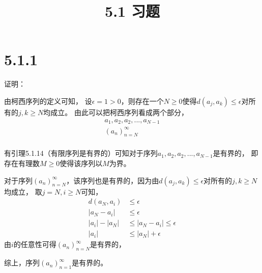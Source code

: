 \documentclass{article}
\theoremstyle{mystyle}
\begin{document}
\title{5.1 习题}
\maketitle

\section*{5.1.1}

证明：

由柯西序列的定义可知，
设$\epsilon = 1 > 0$，则存在一个$N \geq 0$使得$d(a_j,a_k) \leq \epsilon$对所有的$j,k \geq N$均成立。
由此可以把柯西序列看成两个部分，
\begin{align*}
  a_1,a_2,a_2,...,a_{N-1} \\
  (a_n)_{n=N}^\infty      \\
\end{align*}

有引理5.1.14（有限序列是有界的）可知对于序列$a_1,a_2,a_2,...,a_{N-1}$是有界的，
即存在有理数$M \geq 0$使得该序列以$M$为界。

对于序列$(a_n)_{n=N}^\infty$，该序列也是有界的，因为由$d(a_j,a_k) \leq \epsilon$对所有的$j,k \geq N$均成立，
取$j=N, i \geq N$可知，
\begin{align*}
  d(a_N,a_i)  & \leq \epsilon              \\
  |a_N - a_i| & \leq \epsilon              \\
  |a_i|-|a_N| & \leq |a_N - a_i| \leq \epsilon \\
  |a_i|       & \leq |a_N| + \epsilon
\end{align*}
由$i$的任意性可得$(a_n)_{n=N}^\infty$是有界的，

综上，序列$(a_n)_{n=1}^\infty$是有界的。
\end{document}
